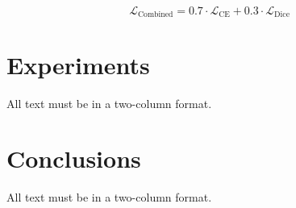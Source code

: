 \documentclass[10pt,twocolumn,letterpaper]{article}
\begin{document}
\begin{equation}
\mathcal{L}_{\text{Combined}} = 0.7 \cdot \mathcal{L}_{\text{CE}} + 0.3 \cdot \mathcal{L}_{\text{Dice}}
\end{equation}


\section{Experiments}

All text must be in a two-column format. 

\section{Conclusions}

All text must be in a two-column format. 


{\small


}
\end{document}
